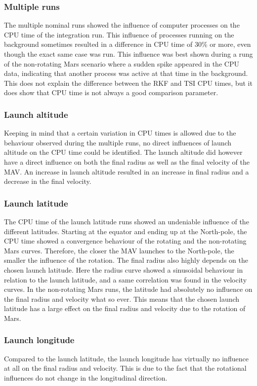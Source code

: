 \subsubsection{Multiple runs}
The multiple nominal runs showed the influence of computer processes on the CPU time of the integration run. This influence of processes running on the background sometimes resulted in a difference in CPU time of 30\% or more, even though the exact same case was run. This influence was best shown during a rung of the non-rotating Mars scenario where a sudden spike appeared in the CPU data, indicating that another process was active at that time in the background. This does not explain the difference between the \ac{RKF} and \ac{TSI} CPU times, but it does show that CPU time is not always a good comparison parameter.


\subsubsection{Launch altitude}
Keeping in mind that a certain variation in CPU times is allowed due to the behaviour observed during the multiple runs, no direct influences of launch altitude on the CPU time could be identified. The launch altitude did however have a direct influence on both the final radius as well as the final velocity of the \ac{MAV}. An increase in launch altitude resulted in an increase in final radius and a decrease in the final velocity. 

\subsubsection{Launch latitude}
The CPU time of the launch latitude runs showed an undeniable influence of the different latitudes. Starting at the equator and ending up at the North-pole, the CPU time showed a convergence behaviour of the rotating and the non-rotating Mars curves. Therefore, the closer the \ac{MAV} launches to the North-pole, the smaller the influence of the rotation. The final radius also highly depends on the chosen launch latitude. Here the radius curve showed a sinusoidal behaviour in relation to the launch latitude, and a same correlation was found in the velocity curves. In the non-rotating Mars runs, the latitude had absolutely no influence on the final radius and velocity what so ever. This means that the chosen launch latitude has a large effect on the final radius and velocity due to the rotation of Mars. 


\subsubsection{Launch longitude}
Compared to the launch latitude, the launch longitude has virtually no influence at all on the final radius and velocity. This is due to the fact that the rotational influences do not change in the longitudinal direction. 

